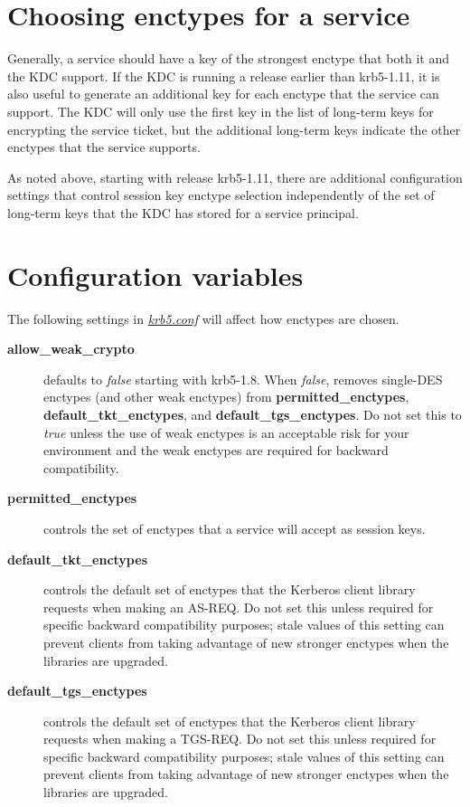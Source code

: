 \documentclass[letterpaper,10pt,english]{sphinxmanual}
\begin{document}
\section{Choosing enctypes for a service}
\label{admin/enctypes:choosing-enctypes-for-a-service}
Generally, a service should have a key of the strongest
enctype that both it and the KDC support.  If the KDC is running a
release earlier than krb5-1.11, it is also useful to generate an
additional key for each enctype that the service can support.  The KDC
will only use the first key in the list of long-term keys for encrypting
the service ticket, but the additional long-term keys indicate the
other enctypes that the service supports.

As noted above, starting with release krb5-1.11, there are additional
configuration settings that control session key enctype selection
independently of the set of long-term keys that the KDC has stored for
a service principal.


\section{Configuration variables}
\label{admin/enctypes:configuration-variables}
The following \code{{[}libdefaults{]}} settings in {\hyperref[admin/conf_files/krb5_conf:krb5-conf-5]{\emph{krb5.conf}}} will
affect how enctypes are chosen.
\begin{description}
\item[{\textbf{allow\_weak\_crypto}}] \leavevmode
defaults to \emph{false} starting with krb5-1.8.  When \emph{false}, removes
single-DES enctypes (and other weak enctypes) from
\textbf{permitted\_enctypes}, \textbf{default\_tkt\_enctypes}, and
\textbf{default\_tgs\_enctypes}.  Do not set this to \emph{true} unless the
use of weak enctypes is an acceptable risk for your environment
and the weak enctypes are required for backward compatibility.

\item[{\textbf{permitted\_enctypes}}] \leavevmode
controls the set of enctypes that a service will accept as session
keys.

\item[{\textbf{default\_tkt\_enctypes}}] \leavevmode
controls the default set of enctypes that the Kerberos client
library requests when making an AS-REQ.  Do not set this unless
required for specific backward compatibility purposes; stale
values of this setting can prevent clients from taking advantage
of new stronger enctypes when the libraries are upgraded.

\item[{\textbf{default\_tgs\_enctypes}}] \leavevmode
controls the default set of enctypes that the Kerberos client
library requests when making a TGS-REQ.  Do not set this unless
required for specific backward compatibility purposes; stale
values of this setting can prevent clients from taking advantage
of new stronger enctypes when the libraries are upgraded.

\end{description}
\end{document}
